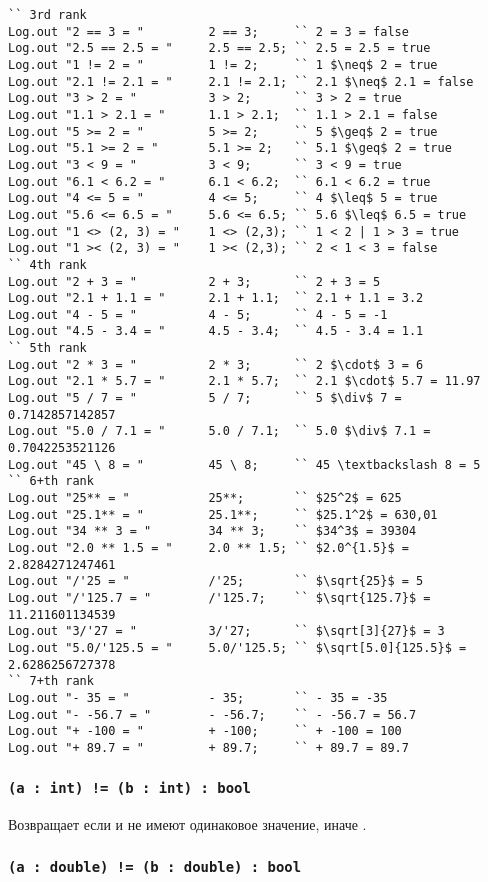 \begin{lstlisting}[caption=Примеры использования операторов над данными типа int и double, label=numberopex]
`` 3rd rank
Log.out "2 == 3 = "			2 == 3;		`` 2 = 3 = false
Log.out "2.5 == 2.5 = "		2.5 == 2.5;	`` 2.5 = 2.5 = true
Log.out "1 != 2 = "			1 != 2;		`` 1 $\neq$ 2 = true
Log.out "2.1 != 2.1 = "		2.1 != 2.1;	`` 2.1 $\neq$ 2.1 = false
Log.out "3 > 2 = "			3 > 2;		`` 3 > 2 = true
Log.out "1.1 > 2.1 = "		1.1 > 2.1;	`` 1.1 > 2.1 = false
Log.out "5 >= 2 = "			5 >= 2;		`` 5 $\geq$ 2 = true
Log.out "5.1 >= 2 = "		5.1 >= 2;	`` 5.1 $\geq$ 2 = true
Log.out "3 < 9 = "			3 < 9;		`` 3 < 9 = true
Log.out "6.1 < 6.2 = "		6.1 < 6.2;	`` 6.1 < 6.2 = true
Log.out "4 <= 5 = "			4 <= 5;		`` 4 $\leq$ 5 = true
Log.out "5.6 <= 6.5 = "		5.6 <= 6.5;	`` 5.6 $\leq$ 6.5 = true
Log.out "1 <> (2, 3) = "	1 <> (2,3); `` 1 < 2 | 1 > 3 = true
Log.out "1 >< (2, 3) = "	1 >< (2,3); `` 2 < 1 < 3 = false
`` 4th rank
Log.out "2 + 3 = "			2 + 3;		`` 2 + 3 = 5
Log.out "2.1 + 1.1 = "		2.1 + 1.1;	`` 2.1 + 1.1 = 3.2
Log.out "4 - 5 = "			4 - 5;		`` 4 - 5 = -1
Log.out "4.5 - 3.4 = "		4.5 - 3.4;	`` 4.5 - 3.4 = 1.1
`` 5th rank
Log.out "2 * 3 = "			2 * 3;		`` 2 $\cdot$ 3 = 6
Log.out "2.1 * 5.7 = "		2.1 * 5.7;	`` 2.1 $\cdot$ 5.7 = 11.97
Log.out "5 / 7 = "			5 / 7;		`` 5 $\div$ 7 = 0.7142857142857
Log.out "5.0 / 7.1 = "		5.0 / 7.1;	`` 5.0 $\div$ 7.1 = 0.7042253521126
Log.out "45 \ 8 = "			45 \ 8;		`` 45 \textbackslash 8 = 5
`` 6+th rank
Log.out "25** = "			25**;		`` $25^2$ = 625
Log.out "25.1** = "			25.1**;		`` $25.1^2$ = 630,01
Log.out "34 ** 3 = "		34 ** 3;	`` $34^3$ = 39304
Log.out "2.0 ** 1.5 = "		2.0 ** 1.5;	`` $2.0^{1.5}$ = 2.8284271247461
Log.out "/'25 = "			/'25;		`` $\sqrt{25}$ = 5
Log.out "/'125.7 = "		/'125.7;	`` $\sqrt{125.7}$ = 11.211601134539
Log.out "3/'27 = "			3/'27;		`` $\sqrt[3]{27}$ = 3
Log.out "5.0/'125.5 = "		5.0/'125.5;	`` $\sqrt[5.0]{125.5}$ = 2.6286256727378
`` 7+th rank
Log.out "- 35 = "			- 35;		`` - 35 = -35
Log.out "- -56.7 = "		- -56.7;	`` - -56.7 = 56.7
Log.out "+ -100 = "			+ -100;		`` + -100 = 100
Log.out "+ 89.7 = "			+ 89.7;		`` + 89.7 = 89.7
\end{lstlisting}

\subsubsection{\lstinline`(a : int) != (b : int) : bool`}

Возвращает \true{} если  и  не имеют одинаковое значение, иначе \false{}.

\subsubsection{\lstinline`(a : double) != (b : double) : bool`}

